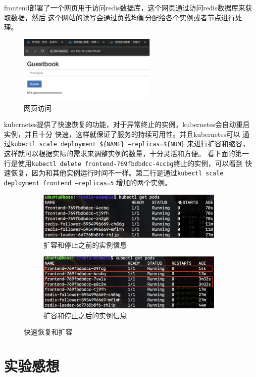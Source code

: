 \documentclass{article}
\begin{document}
\begin{enumerate}
frontend部署了一个网页用于访问redis数据库，这个网页通过访问redis数据库来获取数据，然后
这个网站的读写会通过负载均衡分配给各个实例或者节点进行处理。
\begin{figure}[H]
    \centering
    \includegraphics[width=0.6\textwidth]{webpage.png}
    \caption{网页访问}
    \label{fig:webpage}
\end{figure}

kubernetes提供了快速恢复的功能，对于异常终止的实例，kubernetes会自动重启实例，并且十分
快速，这样就保证了服务的持续可用性。并且kubernetes可以
通过\texttt{kubectl scale deployment \$\{NAME\} --replicas=\$\{NUM\}}
来进行扩容和缩容，这样就可以根据实际的需求来调整实例的数量，十分灵活和方便。
看下面的第一行是使用\texttt{kubectl delete frontend-769fbdbdcc-4ccbg}终止的实例，可以看到
快速恢复，因为和其他实例运行时间不一样。第二行是通过\texttt{kubectl scale deployment frontend --replicas=5}
增加的两个实例。
\begin{figure}[H]
    \begin{subfigure}[b]{0.45\textwidth}
        \centering
        \includegraphics[width=\textwidth]{cos1.png}
        \caption{扩容和停止之前的实例信息}
        \label{fig:cos1}
    \end{subfigure}
    \hfill
    \begin{subfigure}[b]{0.50\textwidth}
        \centering
        \includegraphics[width=\textwidth]{cos2.png}
        \caption{扩容和停止之后的实例信息}
        \label{fig:cos2}
    \end{subfigure}
    \caption{快速恢复和扩容}
\end{figure}
\end{enumerate}
\section{实验感想}
\end{document}
